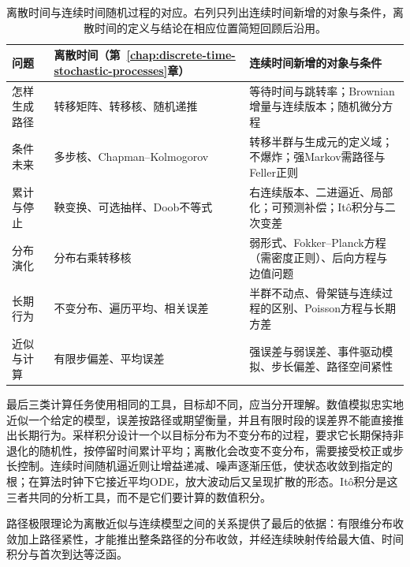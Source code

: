 \begin{table}[htbp]
  \centering
  \begin{tabularx}{\linewidth}{@{}l>{\RaggedRight\arraybackslash}p{50mm}>{\RaggedRight\arraybackslash}X@{}}
    \toprule
    问题 & 离散时间（第~\ref{chap:discrete-time-stochastic-processes}章） & 连续时间新增的对象与条件\\
    \midrule
    怎样生成路径 & 转移矩阵、转移核、随机递推 & 等待时间与跳转率；Brownian增量与连续版本；随机微分方程\\
    条件未来 & 多步核、Chapman--Kolmogorov & 转移半群与生成元的定义域；不爆炸；强Markov需路径与Feller正则\\
    累计与停止 & 鞅变换、可选抽样、Doob不等式 & 右连续版本、二进逼近、局部化；可预测补偿；Itô积分与二次变差\\
    分布演化 & 分布右乘转移核 & 弱形式、Fokker--Planck方程（需密度正则）、后向方程与边值问题\\
    长期行为 & 不变分布、遍历平均、相关误差 & 半群不动点、骨架链与连续过程的区别、Poisson方程与长期方差\\
    近似与计算 & 有限步偏差、平均误差 & 强误差与弱误差、事件驱动模拟、步长偏差、路径空间紧性\\
    \bottomrule
  \end{tabularx}
  \caption{离散时间与连续时间随机过程的对应。右列只列出连续时间新增的对象与条件，离散时间的定义与结论在相应位置简短回顾后沿用。}
  \label{tab:ctsp-discrete-continuous}
\end{table}

最后三类计算任务使用相同的工具，目标却不同，应当分开理解。数值模拟忠实地近似一个给定的模型，误差按路径或期望衡量，并且有限时段的误差界不能直接推出长期行为。采样积分设计一个以目标分布为不变分布的过程，要求它长期保持非退化的随机性，按停留时间累计平均；离散化会改变不变分布，需要接受校正或步长控制。连续时间随机逼近则让增益递减、噪声逐渐压低，使状态收敛到指定的根；在算法时钟下它接近平均ODE，放大波动后又呈现扩散的形态。Itô积分是这三者共同的分析工具，而不是它们要计算的数值积分。

路径极限理论为离散近似与连续模型之间的关系提供了最后的依据：有限维分布收敛加上路径紧性，才能推出整条路径的分布收敛，并经连续映射传给最大值、时间积分与首次到达等泛函。
